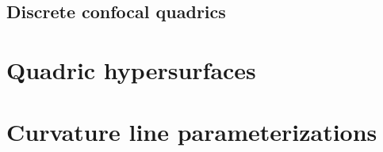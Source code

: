 \documentclass[10pt, a4paper]{article}
\theoremstyle{BoldTopSpacing}
\theoremstyle{BoldTopSpacing}
\theoremstyle{BoldTopSpacing}
\theoremstyle{BoldTopBottomSpacing}
\theoremstyle{BoldTopSpacing}
\theoremstyle{BoldTopBottomSpacing}
\theoremstyle{remark}
\begin{document}
\subsection{Discrete confocal quadrics}
\label{subsec:discrete-confocal-quadrics}
\pagebreak
\appendix
\section{Quadric hypersurfaces}
\label{appendix:quadrics}
\pagebreak
\section{Curvature line parameterizations}
\label{appendix:curvature-lines}
\pagebreak


\pagestyle{tocstyle}


\end{document}
